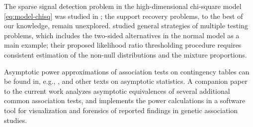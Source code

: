 The sparse signal detection problem in the high-dimensional chi-square model \eqref{eq:model-chisq} was studied in \cite{donoho2004higher}; the support recovery problems, to the best of our knowledge, remain unexplored.
\citet{sun2007oracle} studied general strategies of multiple testing problems, which includes the two-sided alternatives in the normal model as a main example; their proposed likelihood ratio thresholding procedure requires consistent estimation of the non-null distributions and the mixture proportions.

Asymptotic power approximations of association tests on contingency tables can be found in, e.g., \cite{ferguson2017course}, and other texts on asymptotic statistics.
A companion paper to the current work \cite{gao2019upass} analyzes asymptotic equivalences of several additional common association tests, and implements the power calculations in a software tool for visualization and forensics of reported findings in genetic association studies.


